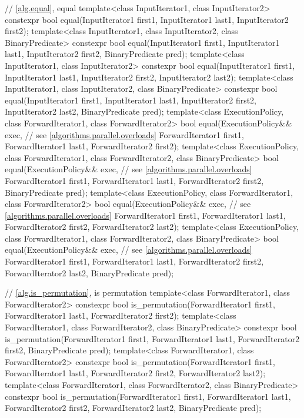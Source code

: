 \begin{codeblock}
{  // \ref{alg.equal}, equal
  template<class InputIterator1, class InputIterator2>
    constexpr bool equal(InputIterator1 first1, InputIterator1 last1,
                         InputIterator2 first2);
  template<class InputIterator1, class InputIterator2, class BinaryPredicate>
    constexpr bool equal(InputIterator1 first1, InputIterator1 last1,
                         InputIterator2 first2, BinaryPredicate pred);
  template<class InputIterator1, class InputIterator2>
    constexpr bool equal(InputIterator1 first1, InputIterator1 last1,
                         InputIterator2 first2, InputIterator2 last2);
  template<class InputIterator1, class InputIterator2, class BinaryPredicate>
    constexpr bool equal(InputIterator1 first1, InputIterator1 last1,
                         InputIterator2 first2, InputIterator2 last2,
                         BinaryPredicate pred);
  template<class ExecutionPolicy, class ForwardIterator1, class ForwardIterator2>
    bool equal(ExecutionPolicy&& exec, // see \ref{algorithms.parallel.overloads}
               ForwardIterator1 first1, ForwardIterator1 last1,
               ForwardIterator2 first2);
  template<class ExecutionPolicy, class ForwardIterator1, class ForwardIterator2,
           class BinaryPredicate>
    bool equal(ExecutionPolicy&& exec, // see \ref{algorithms.parallel.overloads}
               ForwardIterator1 first1, ForwardIterator1 last1,
               ForwardIterator2 first2, BinaryPredicate pred);
  template<class ExecutionPolicy, class ForwardIterator1, class ForwardIterator2>
    bool equal(ExecutionPolicy&& exec, // see \ref{algorithms.parallel.overloads}
               ForwardIterator1 first1, ForwardIterator1 last1,
               ForwardIterator2 first2, ForwardIterator2 last2);
  template<class ExecutionPolicy, class ForwardIterator1, class ForwardIterator2,
           class BinaryPredicate>
    bool equal(ExecutionPolicy&& exec, // see \ref{algorithms.parallel.overloads}
               ForwardIterator1 first1, ForwardIterator1 last1,
               ForwardIterator2 first2, ForwardIterator2 last2,
               BinaryPredicate pred);

  // \ref{alg.is_permutation}, is permutation
  template<class ForwardIterator1, class ForwardIterator2>
    constexpr bool is_permutation(ForwardIterator1 first1, ForwardIterator1 last1,
                                  ForwardIterator2 first2);
  template<class ForwardIterator1, class ForwardIterator2, class BinaryPredicate>
    constexpr bool is_permutation(ForwardIterator1 first1, ForwardIterator1 last1,
                                  ForwardIterator2 first2, BinaryPredicate pred);
  template<class ForwardIterator1, class ForwardIterator2>
    constexpr bool is_permutation(ForwardIterator1 first1, ForwardIterator1 last1,
                                  ForwardIterator2 first2, ForwardIterator2 last2);
  template<class ForwardIterator1, class ForwardIterator2, class BinaryPredicate>
    constexpr bool is_permutation(ForwardIterator1 first1, ForwardIterator1 last1,
                                  ForwardIterator2 first2, ForwardIterator2 last2,
                                  BinaryPredicate pred);

}
\end{codeblock}
